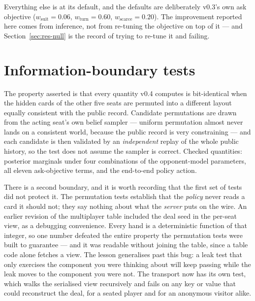 \documentclass[11pt,a4paper]{article}
\begin{document}
Everything else is at its default, and the defaults are deliberately v0.3's own
ask objective ($w_{\mathrm{suit}} = 0.06$, $w_{\mathrm{turn}} = 0.60$,
$w_{\mathrm{scarce}} = 0.20$). The improvement reported here comes from
inference, not from re-tuning the objective on top of it --- and
Section~\ref{sec:res-null} is the record of trying to re-tune it and failing.

\section{Information-boundary tests}
\label{app:leak}

The property asserted is that every quantity v0.4 computes is bit-identical when
the hidden cards of the other five seats are permuted into a different layout
equally consistent with the public record. Candidate permutations are drawn from
the acting seat's own belief sampler --- uniform permutation almost never lands
on a consistent world, because the public record is very constraining --- and
each candidate is then validated by an \emph{independent} replay of the whole
public history, so the test does not assume the sampler is correct. Checked
quantities: posterior marginals under four combinations of the opponent-model
parameters, all eleven ask-objective terms, and the end-to-end policy action.

There is a second boundary, and it is worth recording that the first set of
tests did not protect it. The permutation tests establish that the
\emph{policy} never reads a card it should not; they say nothing about what the
\emph{server} puts on the wire. An earlier revision of the multiplayer table
included the deal seed in the per-seat view, as a debugging convenience. Every
hand is a deterministic function of that integer, so one number defeated the
entire property the permutation tests were built to guarantee --- and it was
readable without joining the table, since a table code alone fetches a view.
The lesson generalises past this bug: a leak test that only exercises the
component you were thinking about will keep passing while the leak moves to the
component you were not. The transport now has its own test, which walks the
serialised view recursively and fails on any key or value that could reconstruct
the deal, for a seated player and for an anonymous visitor alike.
\end{document}
